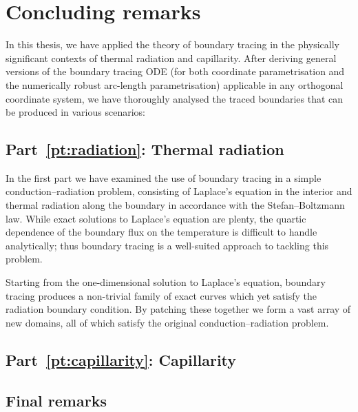 \chapter{Concluding remarks}
\label{ch:concluding}

In this thesis,
we have applied the theory of boundary tracing
in the physically significant contexts
of thermal radiation and capillarity.
After deriving general versions of the boundary tracing ODE
(for both coordinate parametrisation
and the numerically robust arc-length parametrisation)
applicable in any orthogonal coordinate system,
we have thoroughly analysed
the traced boundaries that can be produced in various scenarios:

\section{Part~\ref*{pt:radiation}: Thermal radiation}
\label{sec:concluding.radiation}

In the first part we have examined the use of boundary tracing
in a simple conduction--radiation problem,
consisting of Laplace's equation in the interior
and thermal radiation along the boundary
in accordance with the Stefan--Boltzmann law.
While exact solutions to Laplace's equation are plenty,
the quartic dependence of the boundary flux on the temperature
is difficult to handle analytically;
thus boundary tracing is a well-suited approach to tackling this problem.

Starting from the one-dimensional solution to Laplace's equation,
boundary tracing produces a non-trivial family of exact curves
which yet satisfy the radiation boundary condition.
By patching these together
we form a vast array of new domains,
all of which satisfy the original conduction--radiation problem.

\section{Part~\ref*{pt:capillarity}: Capillarity}
\label{sec:concluding.capillarity}

\section{Final remarks}
\label{sec:concluding.final}
